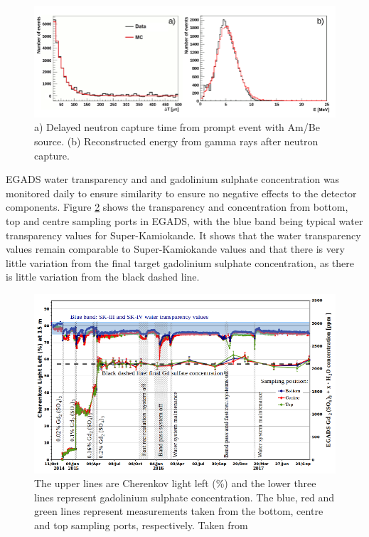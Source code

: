 \begin{figure}[H]
    \includegraphics[width=\textwidth]{Figures/egads_ambe.png}
\caption{a) Delayed neutron capture time from prompt event with Am/Be source. (b) Reconstructed energy from gamma rays after neutron capture.}
\label{fig:EGADS_ambe_capture}
\end{figure}

EGADS water transparency and and gadolinium sulphate concentration was monitored daily to ensure similarity to ensure no negative effects to the detector components. Figure \ref{fig:egads_transparency} shows the transparency and concentration from bottom, top and centre sampling ports in EGADS, with the blue band being typical water transparency values for Super-Kamiokande. It shows that the water transparency values remain comparable to Super-Kamiokande values and that there is very little variation from the final target gadolinium sulphate concentration, as there is little variation from the black dashed line. 

\begin{figure}[H]
\includegraphics[width=\textwidth]{Figures/egads_concentration.png}
\caption{The upper lines are Cherenkov light left (\%) and the lower three lines represent gadolinium sulphate concentration. The blue, red and green lines represent measurements taken from the bottom, centre and top sampling ports, respectively. Taken from \cite{martiEvaluationGadoliniumAction2020}}
\label{fig:egads_transparency}
\end{figure}

